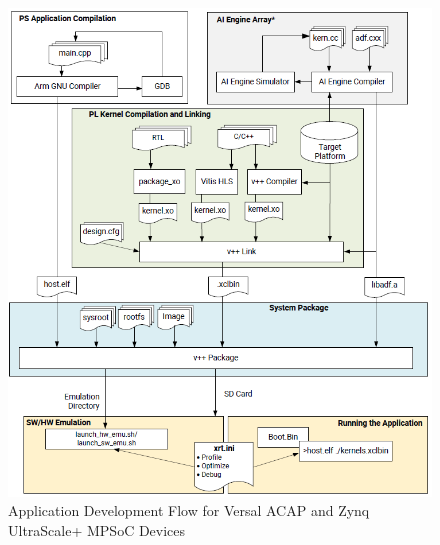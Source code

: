 \begin{figure}[H]
    \begin{center}
        \includegraphics[width=\textwidth]{images/EmbeddedFlow.PNG}
        \caption{Application Development Flow for Versal ACAP and Zynq UltraScale+ MPSoC Devices}
        \label{EmbeddedFlow}
    \end{center}
\end{figure}

\clearpage

